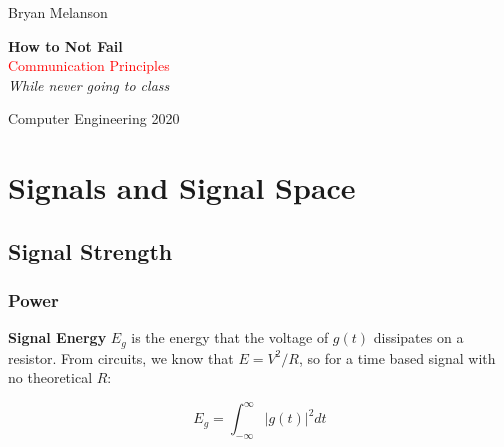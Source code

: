 \documentclass[11pt]{article}
\newcommand*{\plogo}{\fbox{$\mathcal{BM}$}}
\begin{document}
 
        
    \begin{titlepage}
    
        \raggedleft
        
        \vspace*{\baselineskip}
        
        {\Large Bryan Melanson}
        
        \vspace*{0.167\textheight}
        
        \textbf{\LARGE How to Not Fail}\\[\baselineskip]
        
        {\textcolor{Red}{\Huge Communication Principles}}\\[\baselineskip]
        
        {\Large \textit{While never going to class}}
        
        \vfill
        
        {\large Computer Engineering 2020 ~~\plogo}
        
        \vspace*{3\baselineskip}
    
    \end{titlepage}

    \pagebreak
    
    
    \tableofcontents
\pagebreak

\section{Signals and Signal Space}

\subsection{Signal Strength}

\subsubsection{Power}

\textbf{Signal Energy} $E_g$ is the energy that the voltage of $g(t)$ dissipates on a resistor. From circuits, we know that $E = V^2/R$, so for a time based signal with no theoretical $R$:

$$E_g = \int^{\infty}_{-\infty}|g(t)|^2 dt$$
\end{document}
